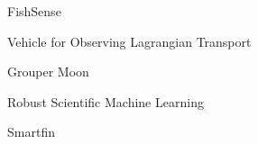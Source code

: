\item FishSense
\item Vehicle for Observing Lagrangian Transport
\item Grouper Moon
\item Robust Scientific Machine Learning
\item Smartfin
